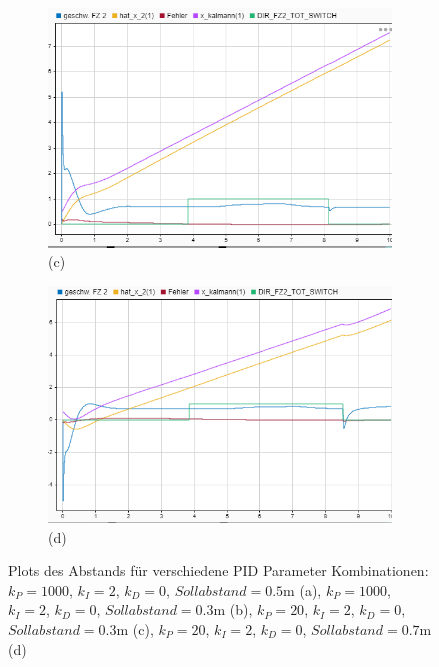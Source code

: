 \begin{figure}[hbt]
\begin{subfigure}{0.49\textwidth}
    \includegraphics*[width=\textwidth]{figures/pid03.png}\\
    (c)
\end{subfigure}
\begin{subfigure}{0.49\textwidth}
    \centering
    \includegraphics*[width=\textwidth]{figures/pid07.png}\\
    (d)
\end{subfigure}
    \caption{Plots des Abstands für verschiedene PID Parameter Kombinationen:
        $k_P = 1000$, $k_I =2$, $k_D =0$, $Sollabstand = 0.5 \mathrm{m}$ (a), 
        $k_P = 1000$, $k_I =2$, $k_D =0$, $Sollabstand = 0.3 \mathrm{m}$ (b), 
        $k_P = 20$, $k_I =2$, $k_D =0$, $Sollabstand = 0.3 \mathrm{m}$ (c), 
        $k_P = 20$, $k_I =2$, $k_D =0$, $Sollabstand = 0.7 \mathrm{m}$ (d)
    \label{fig:pid}}
\end{figure}    

